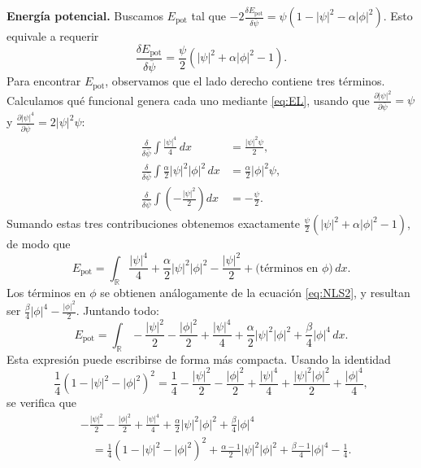 \documentclass[letterpaper,11pt]{exam}
\theoremstyle{plain}
\begin{document}
\noindent\textbf{Energía potencial.}
Buscamos $E_{\mathrm{pot}}$ tal que
$-2\frac{\delta E_{\mathrm{pot}}}{\delta\bar{\psi}} = \psi(1 - |\psi|^2 - \alpha|\phi|^2)$.
Esto equivale a requerir
\begin{equation}
    \frac{\delta E_{\mathrm{pot}}}{\delta\bar{\psi}}
    = \frac{\psi}{2}\left(|\psi|^2 + \alpha|\phi|^2 - 1\right).
\end{equation}
Para encontrar $E_{\mathrm{pot}}$, observamos que el lado derecho contiene tres términos.
Calculamos qué funcional genera cada uno mediante \eqref{eq:EL}, usando que
$\frac{\partial|\psi|^2}{\partial\bar{\psi}} = \psi$ y $\frac{\partial|\psi|^4}{\partial\bar{\psi}} = 2|\psi|^2\psi$:
\begin{align}
    \frac{\delta}{\delta\bar{\psi}}\int \frac{|\psi|^4}{4}\,dx &= \frac{|\psi|^2\psi}{2},\\
    \frac{\delta}{\delta\bar{\psi}}\int \frac{\alpha}{2}|\psi|^2|\phi|^2\,dx &= \frac{\alpha}{2}|\phi|^2\psi,\\
    \frac{\delta}{\delta\bar{\psi}}\int \left(-\frac{|\psi|^2}{2}\right)dx &= -\frac{\psi}{2}.
\end{align}
Sumando estas tres contribuciones obtenemos exactamente
$\frac{\psi}{2}(|\psi|^2 + \alpha|\phi|^2 - 1)$, de modo que
\begin{equation}
    E_{\mathrm{pot}} = \int_{\mathbb{R}}
    \frac{|\psi|^4}{4} + \frac{\alpha}{2}|\psi|^2|\phi|^2 - \frac{|\psi|^2}{2}
    + \text{(términos en }\phi\text{)}\,dx.
\end{equation}
Los términos en $\phi$ se obtienen análogamente de la ecuación \eqref{eq:NLS2}, y resultan
ser $\frac{\beta}{4}|\phi|^4 - \frac{|\phi|^2}{2}$. Juntando todo:
\begin{equation}
    E_{\mathrm{pot}} = \int_{\mathbb{R}}
    - \frac{|\psi|^2}{2} - \frac{|\phi|^2}{2}
    + \frac{|\psi|^4}{4} + \frac{\alpha}{2}|\psi|^2|\phi|^2
    + \frac{\beta}{4}|\phi|^4\,dx.
\end{equation}
Esta expresión puede escribirse de forma más compacta. Usando la identidad
\begin{equation}\label{eq:expansion}
    \frac{1}{4}(1 - |\psi|^2 - |\phi|^2)^2
    = \frac{1}{4} - \frac{|\psi|^2}{2} - \frac{|\phi|^2}{2}
    + \frac{|\psi|^4}{4} + \frac{|\psi|^2|\phi|^2}{2} + \frac{|\phi|^4}{4},
\end{equation}
se verifica que
\begin{align}
    &- \frac{|\psi|^2}{2} - \frac{|\phi|^2}{2}
    + \frac{|\psi|^4}{4} + \frac{\alpha}{2}|\psi|^2|\phi|^2 + \frac{\beta}{4}|\phi|^4
    \nonumber\\
    &\quad= \frac{1}{4}(1-|\psi|^2-|\phi|^2)^2
    + \frac{\alpha-1}{2}|\psi|^2|\phi|^2
    + \frac{\beta-1}{4}|\phi|^4 - \frac{1}{4}.
\end{align}
\end{document}
